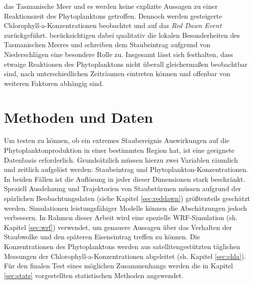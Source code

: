 \documentclass[12pt,a4paper,onecolumn,headheight=30pt]{scrartcl}
\begin{document}
das Tasmanische Meer und es werden keine explizite Aussagen zu einer Reaktionszeit des Phytoplanktons getroffen. Dennoch werden gesteigerte Chlorophyll-a-Konzentrationen beobachtet und auf das \textit{Red Dawn Event} zurückgeführt. \citet{Gabric.2016} berücksichtigen dabei qualitativ die lokalen Besonderheiten des Tasmanischen Meeres und schreiben dem Staubeintrag aufgrund von Niederschlägen eine besondere Rolle zu. Insgesamt lässt sich festhalten, dass etwaige Reaktionen des Phytoplanktons nicht überall gleichermaßen beobachtbar sind, nach unterschiedlichen Zeiträumen eintreten können und offenbar von  weiteren Faktoren abhängig sind. 
\section{Methoden und Daten} \label{sec:Methoden}
Um testen zu können, ob ein extremes Staubereignis Auswirkungen auf die Phytoplanktonproduktion in einer bestimmten Region hat, ist eine geeignete Datenbasis erforderlich. Grundsätzlich müssen hierzu zwei Variablen räumlich und zeitlich aufgelöst werden: Staubeintrag und Phytoplankton-Konzentrationen. In beiden Fällen ist die Auflösung in jeder dieser Dimensionen stark beschränkt. Speziell Ausdehnung und Trajektorien von Staubstürmen müssen aufgrund der spärlichen Beobachtungsdaten (siehe Kapitel  \ref{sec:reddawn}) größtenteils geschätzt werden. Simulationen leistungsfähiger Modelle können die Abschätzungen jedoch verbessern. In Rahmen dieser Arbeit wird eine spezielle WRF-Simulation (sh. Kapitel \ref{sec:wrf}) verwendet, um genauere Aussagen über das Verhalten der Staubwolke und den späteren Eiseneintrag treffen zu können. Die Konzentrationen des Phytoplanktons werden aus satellitengestützten täglichen Messungen der Chlorophyll-a-Konzentrationen abgeleitet (sh. Kapitel \ref{sec:chla}). Für den finalen Test eines möglichen Zusammenhangs werden die in Kapitel \ref{sec:stats} vorgestellten statistischen Methoden angewendet.
\end{document}

